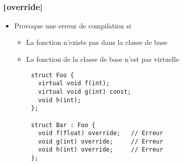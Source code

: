 \documentclass[C++.tex]{subfiles}
\begin{document}
\begin{frame}[fragile]
	\frametitle{\texttt|override|}
	\begin{itemize}
		\item Provoque une erreur de compilation si
		\begin{itemize}
			\item La fonction n'existe pas dans la classe de base
			\item La fonction de la classe de base n'est pas virtuelle
		\end{itemize}
	\end{itemize}

	\begin{verbatim}
		struct Foo {
		  virtual void f(int); 
		  virtual void g(int) const;
		  void h(int);
		};

		struct Bar : Foo {
		  void f(float) override;   // Erreur 
		  void g(int) override;     // Erreur
		  void h(int) override;     // Erreur
		};
	\end{verbatim}

\end{frame}
\end{document}
